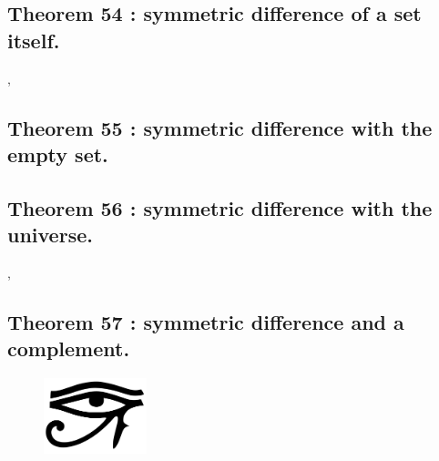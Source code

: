 \documentclass[preview]{standalone}
\begin{document}
\subsection[Symmetric difference between a set and itself.]
    {
        \color{section}Theorem 54 \color{black} : symmetric difference of a set itself.
    }

\sep


\subsection[Symmetric difference with the empty set.]
    {
        \color{section}Theorem 55 \color{black} : symmetric difference with the empty set.
    }

\pagebreak


\subsection[Symmetric difference with the universe.]
    {
        \color{section}Theorem 56 \color{black} : symmetric difference with the universe.
    }

\sep


\subsection[Symmetric difference with a complement.]
    {
        \color{section}Theorem 57 \color{black} : symmetric difference and a complement.
    }

\begin{figure}[!h]
    \centering
    \includegraphics[width=3cm]{../resources/jpg/2.2.set.operations/horus.png}
\end{figure}


\end{document}
